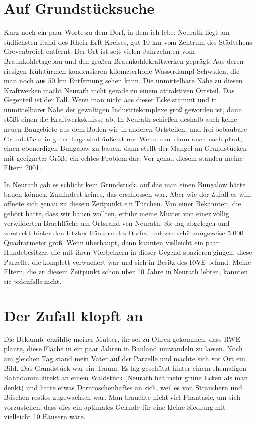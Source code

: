 \documentclass[fontsize=12pt,a4paper,headinclude,DIV=calc,automark]{scrbook}
\begin{document}
\section{Auf Grundstücksuche}

Kurz noch ein paar Worte zu dem Dorf, in dem ich lebe: Neurath liegt am südlichsten Rand des Rhein-Erft-Kreises, gut 10 km vom Zentrum des Städtchens Grevenbroich entfernt. Der Ort ist seit vielen Jahrzehnten vom Braunkohletagebau und den großen Braunkohlekraftwerken geprägt. Aus deren riesigen Kühltürmen kondensieren kilometerhohe Wasserdampf-Schwaden, die man noch aus 50 km Entfernung sehen kann. Die unmittelbare Nähe zu diesen Kraftwerken macht Neurath nicht gerade zu einem attraktiven Ortsteil. Das Gegenteil ist der Fall. Wenn man nicht aus dieser Ecke stammt und in unmittelbarer Nähe der gewaltigen Industriekomplexe groß geworden ist, dann stößt einen die Kraftwerkskulisse ab. In Neurath schießen deshalb auch keine neuen Baugebiete aus dem Boden wie in anderen Ortsteilen, und frei bebaubare Grundstücke in guter Lage sind äußerst rar. Wenn man dann auch noch plant, einen ebenerdigen Bungalow zu bauen, dann stellt der Mangel an Grundstücken mit geeigneter Größe ein echtes Problem dar. Vor genau diesem standen meine Eltern 2001.

In Neurath gab es schlicht kein Grundstück, auf das man einen Bungalow hätte bauen können. Zumindest keines, das erschlossen war. Aber wie der Zufall es will, öffnete sich genau zu diesem Zeitpunkt ein Türchen. Von einer Bekannten, die gehört hatte, dass wir bauen wollten, erfuhr meine Mutter von einer völlig verwilderten Brachfläche am Ortsrand von Neurath. Sie lag abgelegen und versteckt hinter den letzten Häusern des Dorfes und war schätzungsweise 5.000 Quadratmeter groß. Wenn überhaupt, dann kannten vielleicht ein paar Hundebesitzer, die mit ihren Vierbeinern in dieser Gegend spazieren gingen, diese Parzelle, die komplett verwuchert war und sich in Besitz des RWE befand. Meine Eltern, die zu diesem Zeitpunkt schon über 10 Jahre in Neurath lebten, kannten sie jedenfalls nicht.

\section{Der Zufall klopft an}

Die Bekannte erzählte meiner Mutter, ihr sei zu Ohren gekommen, dass RWE plante, diese Fläche in ein paar Jahren in Bauland umwandeln zu lassen. Noch am gleichen Tag stand mein Vater auf der Parzelle und machte sich vor Ort ein Bild. Das Grundstück war ein Traum. Es lag geschützt hinter einem ehemaligen Bahndamm direkt an einem Waldstück (Neurath hat mehr grüne Ecken als man denkt) und hatte etwas Dornröschenhaftes an sich, weil es von Sträuchern und Büschen restlos zugewachsen war. Man brauchte nicht viel Phantasie, um sich vorzustellen, dass dies ein optimales Gelände für eine kleine Siedlung mit vielleicht 10 Häusern wäre.
\end{document}
